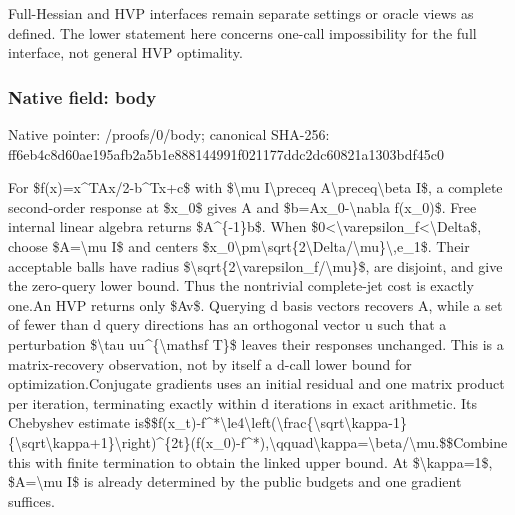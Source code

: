 \documentclass[10pt,a4paper]{article}
\begin{document}
\begingroup\raggedright\sloppy Full-Hessian and HVP interfaces remain separate settings or oracle views as defined. The lower statement here concerns one-call impossibility for the full interface,\allowbreak{} not general HVP optimality.\par\endgroup

\subsubsection{Native field: body}
Native pointer: /proofs/0/body; canonical SHA-256: ff6eb4c8d60ae195afb2a5b1e888144991f021177ddc2dc60821a1303bdf45c0

\begingroup\raggedright\sloppy For \$f(x)=\allowbreak{}x\textasciicircum{}TAx/\allowbreak{}2-b\textasciicircum{}Tx+c\$ with \$\textbackslash{}mu I\textbackslash{}preceq A\textbackslash{}preceq\textbackslash{}beta I\$,\allowbreak{} a complete second-order response at \$x\_\allowbreak{}0\$ gives A and \$b=\allowbreak{}Ax\_\allowbreak{}0-\textbackslash{}nabla f(x\_\allowbreak{}0)\$. Free internal linear algebra returns \$A\textasciicircum{}\{-1\}b\$. When \$0<\textbackslash{}varepsilon\_\allowbreak{}f<\textbackslash{}Delta\$,\allowbreak{} choose \$A=\allowbreak{}\textbackslash{}mu I\$ and centers \$x\_\allowbreak{}0\textbackslash{}pm\textbackslash{}sqrt\{2\textbackslash{}Delta/\allowbreak{}\textbackslash{}mu\}\textbackslash{},\allowbreak{}e\_\allowbreak{}1\$. Their acceptable balls have radius \$\textbackslash{}sqrt\{2\textbackslash{}varepsilon\_\allowbreak{}f/\allowbreak{}\textbackslash{}mu\}\$,\allowbreak{} are disjoint,\allowbreak{} and give the zero-query lower bound. Thus the nontrivial complete-jet cost is exactly one.\newline{}\newline{}An HVP returns only \$Av\$. Querying d basis vectors recovers A,\allowbreak{} while a set of fewer than d query directions has an orthogonal vector u such that a perturbation \$\textbackslash{}tau uu\textasciicircum{}\{\textbackslash{}mathsf T\}\$ leaves their responses unchanged. This is a matrix-recovery observation,\allowbreak{} not by itself a d-call lower bound for optimization.\newline{}\newline{}Conjugate gradients uses an initial residual and one matrix product per iteration,\allowbreak{} terminating exactly within d iterations in exact arithmetic. Its Chebyshev estimate is\newline{}\$\$f(x\_\allowbreak{}t)-f\textasciicircum{}*\textbackslash{}le4\textbackslash{}left(\textbackslash{}frac\{\textbackslash{}sqrt\textbackslash{}kappa-1\}\{\textbackslash{}sqrt\textbackslash{}kappa+1\}\textbackslash{}right)\textasciicircum{}\{2t\}(f(x\_\allowbreak{}0)-f\textasciicircum{}*),\allowbreak{}\textbackslash{}qquad\textbackslash{}kappa=\allowbreak{}\textbackslash{}beta/\allowbreak{}\textbackslash{}mu.\$\$\newline{}Combine this with finite termination to obtain the linked upper bound. At \$\textbackslash{}kappa=\allowbreak{}1\$,\allowbreak{} \$A=\allowbreak{}\textbackslash{}mu I\$ is already determined by the public budgets and one gradient suffices. 
\end{document}
